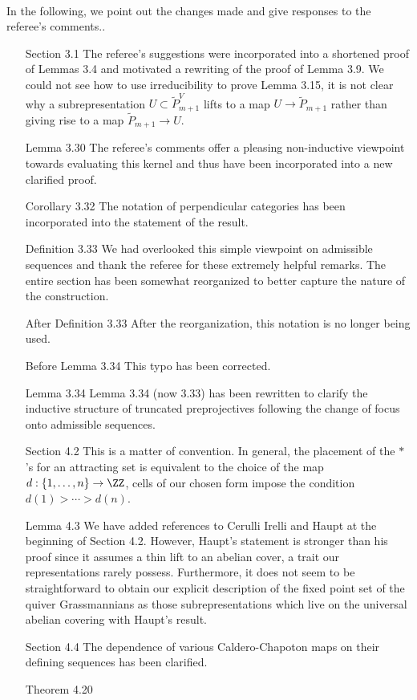 \documentclass[titlepage,11pt,a4paper]{{scrartcl}}
\begin{document}
\pagestyle{empty}


\\


\noindent In the following, we point out the changes made and give responses to the referee's comments..

\renewcommand{\labelenumi}{(\arabic{enumi})}
\begin{enumerate}
  \item[Section 3.1] The referee's suggestions were incorporated into a shortened proof of Lemmas 3.4 and motivated a rewriting of the proof of Lemma 3.9.
    We could not see how to use irreducibility to prove Lemma 3.15, it is not clear why a subrepresentation $U \subset \tilde P_{m+1}^V$ lifts to a map $U \to \tilde P_{m+1}$ rather than giving rise to a map $\tilde P_{m+1} \to U$.
  \item[Lemma 3.30] The referee's comments offer a pleasing non-inductive viewpoint towards evaluating this kernel and thus have been incorporated into a new clarified proof.
  \item[Corollary 3.32] The notation of perpendicular categories has been incorporated into the statement of the result.
  \item[Definition 3.33] We had overlooked this simple viewpoint on admissible sequences and thank the referee for these extremely helpful remarks.
    The entire section has been somewhat reorganized to better capture the nature of the construction.
  \item[After Definition 3.33] After the reorganization, this notation is no longer being used.
  \item[Before Lemma 3.34] This typo has been corrected.
  \item[Lemma 3.34] Lemma 3.34 (now 3.33) has been rewritten to clarify the inductive structure of truncated preprojectives following the change of focus onto admissible sequences.
  \item[Section 4.2] This is a matter of convention.
    In general, the placement of the $*$'s for an attracting set is equivalent to the choice of the map $d:\{1,\ldots,n\}\to\ZZ$, cells of our chosen form impose the condition $d(1)>\cdots>d(n)$.
  \item[Lemma 4.3] We have added references to Cerulli Irelli and Haupt at the beginning of Section 4.2.
    However, Haupt's statement is stronger than his proof since it assumes a thin lift to an abelian cover, a trait our representations rarely possess.
    Furthermore, it does not seem to be straightforward to obtain our explicit description of the fixed point set of the quiver Grassmannians as those subrepresentations which live on the universal abelian covering with Haupt's result. 
  \item[Section 4.4] The dependence of various Caldero-Chapoton maps on their defining sequences has been clarified.
  \item[Theorem 4.20] 
\end{enumerate}
\end{document}
